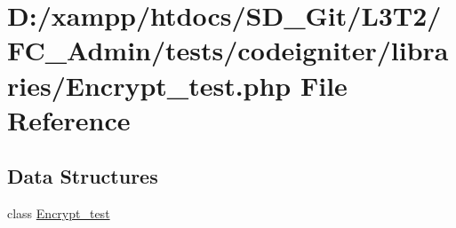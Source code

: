 \hypertarget{_admin_2tests_2codeigniter_2libraries_2_encrypt__test_8php}{}\section{D\+:/xampp/htdocs/\+S\+D\+\_\+\+Git/\+L3\+T2/\+F\+C\+\_\+\+Admin/tests/codeigniter/libraries/\+Encrypt\+\_\+test.php File Reference}
\label{_admin_2tests_2codeigniter_2libraries_2_encrypt__test_8php}
\subsection*{Data Structures}
\begin{DoxyCompactItemize}
\item 
class \hyperlink{class_encrypt__test}{Encrypt\+\_\+test}
\end{DoxyCompactItemize}
